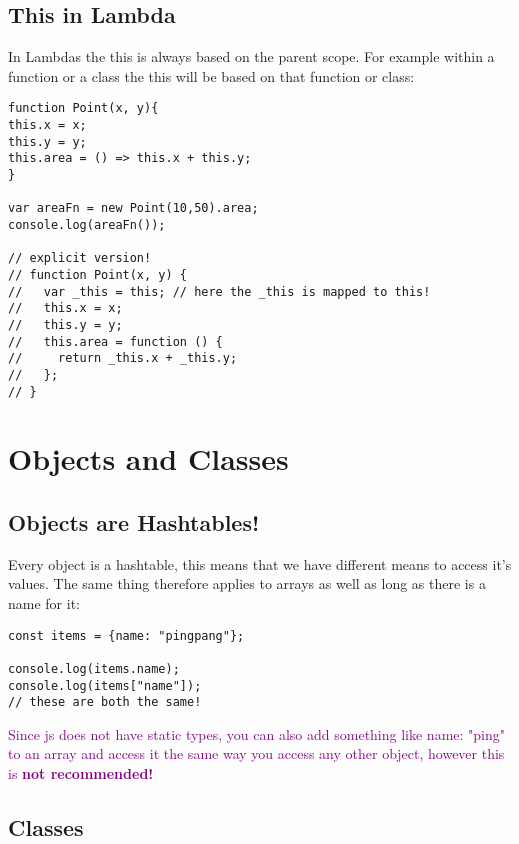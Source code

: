 \documentclass[main.tex,fontsize=6pt,paper=a4,paper=landscape,DIV=calc,]{scrartcl}
\begin{document}
\begin{multicols*}{4}
\subsection{This in Lambda} 
In Lambdas the this is always based on the parent scope.\newline
For example within a function or a class the this will be based on that function or class:
\vspace{-2mm}
\begin{lstlisting}
function Point(x, y){
this.x = x;
this.y = y;
this.area = () => this.x + this.y;
}

var areaFn = new Point(10,50).area;
console.log(areaFn());

// explicit version!
// function Point(x, y) {
//   var _this = this; // here the _this is mapped to this!
//   this.x = x;
//   this.y = y;
//   this.area = function () {
//     return _this.x + _this.y;
//   };
// }
\end{lstlisting}
\vspace{2mm}


\section{Objects and Classes}

\subsection{Objects are Hashtables!} 
Every object is a hashtable, this means that we have different means to access it's values. \newline
The same thing therefore applies to arrays as well as long as there is a name for it:
\vspace{-2mm}
\begin{lstlisting}
const items = {name: "pingpang"};

console.log(items.name);
console.log(items["name"]);
// these are both the same!
\end{lstlisting}
\vspace{2mm}
\textcolor{purple}{Since js does not have static types, you can also add something like name: "ping" to an array and access it the same way you access any other object, however this is \textbf{not recommended!}}

\subsection{Classes} 


\end{multicols*}
\end{document}
